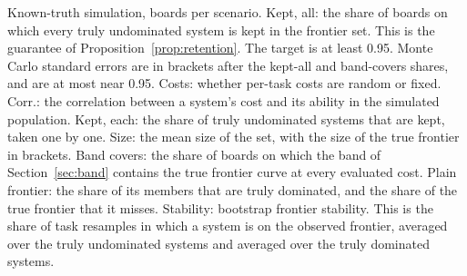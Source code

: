 \documentclass[11pt]{article}
\begin{document}
\begin{table}[!tbp]
\centering\small
\resizebox{\textwidth}{!}{}
\caption{Known-truth simulation, \NumValR{} boards per scenario. Kept, all: the share of boards on which every truly undominated system is kept in the frontier set. This is the guarantee of Proposition~\ref{prop:retention}. The target is at least 0.95. Monte Carlo standard errors are in brackets after the kept-all and band-covers shares, and are at most \NumValMcSeMax{} near 0.95. Costs: whether per-task costs are random or fixed. Corr.: the correlation between a system's cost and its ability in the simulated population. Kept, each: the share of truly undominated systems that are kept, taken one by one. Size: the mean size of the set, with the size of the true frontier in brackets. Band covers: the share of boards on which the band of Section~\ref{sec:band} contains the true frontier curve at every evaluated cost. Plain frontier: the share of its members that are truly dominated, and the share of the true frontier that it misses. Stability: bootstrap frontier stability. This is the share of task resamples in which a system is on the observed frontier, averaged over the truly undominated systems and averaged over the truly dominated systems.}
\label{tab:valfrontier}
\end{table}
\end{document}
